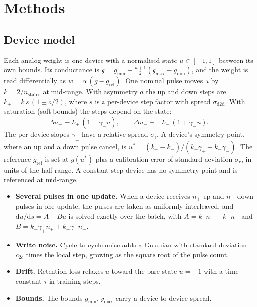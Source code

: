 \section{Methods}\label{sec:methods}

\subsection{Device model}\label{sec:model}
Each analog weight is one device with a normalised state $u\in[-1,1]$ between its own bounds. Its conductance is
$g=g_{\min}+\tfrac{u+1}{2}(g_{\max}-g_{\min})$, and the weight is read differentially as $w=\alpha\,(g-g_{\mathrm{ref}})$. One
nominal pulse moves $u$ by $k=2/n_{\mathrm{states}}$ at mid-range. With asymmetry $a$ the up and down steps are
$k_\pm=k\,s\,(1\pm a/2)$, where $s$ is a per-device step factor with spread $\sigma_{\mathrm{d2d}}$. With saturation (soft
bounds) the steps depend on the state:
\begin{equation}
\Delta u_+ = k_+\,(1-\gamma_+ u),\qquad \Delta u_- = -k_-\,(1+\gamma_- u).
\end{equation}
The per-device slopes $\gamma_\pm$ have a relative spread $\sigma_\gamma$. A device's symmetry point, where an up and a down
pulse cancel, is $u^*=(k_+-k_-)/(k_+\gamma_++k_-\gamma_-)$. The reference $g_{\mathrm{ref}}$ is set at $g(u^*)$ plus a calibration
error of standard deviation $\sigma_r$, in units of the half-range. A constant-step device has no symmetry point and is
referenced at mid-range.

\begin{itemize}
\item \textbf{Several pulses in one update.} When a device receives $n_+$ up and $n_-$ down pulses in one update, the pulses are
      taken as uniformly interleaved, and $\mathrm{d}u/\mathrm{d}s=A-Bu$ is solved exactly over the batch, with
      $A=k_+n_+-k_-n_-$ and $B=k_+\gamma_+n_++k_-\gamma_-n_-$.
\item \textbf{Write noise.} Cycle-to-cycle noise adds a Gaussian with standard deviation $c_{2c}$ times the local step, growing
      as the square root of the pulse count.
\item \textbf{Drift.} Retention loss relaxes $u$ toward the bare state $u=-1$ with a time constant $\tau$ in training steps.
\item \textbf{Bounds.} The bounds $g_{\min}$, $g_{\max}$ carry a device-to-device spread.
\end{itemize}

